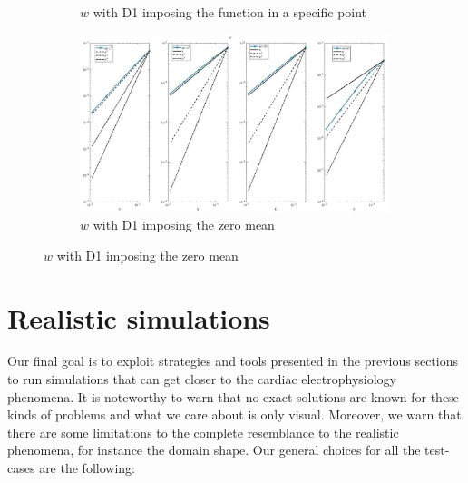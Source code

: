\documentclass[a4paper,11pt]{article}
\begin{document}
\begin{figure}[h]
\begin{subfigure}{0.5\textwidth}
\caption*{$w$ with D1 imposing the function in a specific point}
\label{w_1}
\end{subfigure}
\begin{subfigure}{0.5\textwidth}
\includegraphics[width =9cm]{./D1_w_2.jpg}
\caption*{$w$ with D1 imposing the zero mean}
\label{w_2}
\end{subfigure}
\end{figure}
\restoregeometry
\newpage
\section{Realistic simulations} \label{real_sim}
Our final goal is to exploit strategies and tools presented in the previous sections to run simulations that can get closer to the cardiac electrophysiology phenomena. It is noteworthy to warn that no exact solutions are known for these kinds of problems and what we care about is only visual. Moreover, we warn that there are some limitations to the complete resemblance to the realistic phenomena, for instance the domain shape. Our general choices for all the test-cases are the following:
\end{document}
